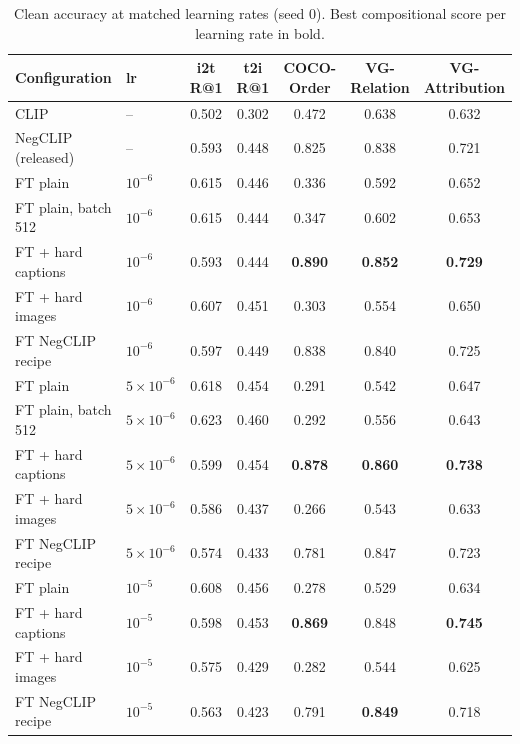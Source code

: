 \documentclass[11pt,a4paper]{article}
\begin{document}
\begin{table}[H]
\centering\small
\caption{Clean accuracy at matched learning rates (seed 0). Best compositional score per learning rate in bold.}
\label{tab:matched}
\begin{tabular}{@{}llccccc@{}}
\toprule
Configuration & lr & i2t R@1 & t2i R@1 & COCO-Order & VG-Relation & VG-Attribution\\
\midrule
CLIP & -- & 0.502 & 0.302 & 0.472 & 0.638 & 0.632\\
NegCLIP (released) & -- & 0.593 & 0.448 & 0.825 & 0.838 & 0.721\\
\midrule
FT plain & $10^{-6}$ & 0.615 & 0.446 & 0.336 & 0.592 & 0.652\\
FT plain, batch 512 & $10^{-6}$ & 0.615 & 0.444 & 0.347 & 0.602 & 0.653\\
FT + hard captions & $10^{-6}$ & 0.593 & 0.444 & \textbf{0.890} & \textbf{0.852} & \textbf{0.729}\\
FT + hard images & $10^{-6}$ & 0.607 & 0.451 & 0.303 & 0.554 & 0.650\\
FT NegCLIP recipe & $10^{-6}$ & 0.597 & 0.449 & 0.838 & 0.840 & 0.725\\
\midrule
FT plain & $5\times10^{-6}$ & 0.618 & 0.454 & 0.291 & 0.542 & 0.647\\
FT plain, batch 512 & $5\times10^{-6}$ & 0.623 & 0.460 & 0.292 & 0.556 & 0.643\\
FT + hard captions & $5\times10^{-6}$ & 0.599 & 0.454 & \textbf{0.878} & \textbf{0.860} & \textbf{0.738}\\
FT + hard images & $5\times10^{-6}$ & 0.586 & 0.437 & 0.266 & 0.543 & 0.633\\
FT NegCLIP recipe & $5\times10^{-6}$ & 0.574 & 0.433 & 0.781 & 0.847 & 0.723\\
\midrule
FT plain & $10^{-5}$ & 0.608 & 0.456 & 0.278 & 0.529 & 0.634\\
FT + hard captions & $10^{-5}$ & 0.598 & 0.453 & \textbf{0.869} & 0.848 & \textbf{0.745}\\
FT + hard images & $10^{-5}$ & 0.575 & 0.429 & 0.282 & 0.544 & 0.625\\
FT NegCLIP recipe & $10^{-5}$ & 0.563 & 0.423 & 0.791 & \textbf{0.849} & 0.718\\
\bottomrule
\end{tabular}
\end{table}
\end{document}
